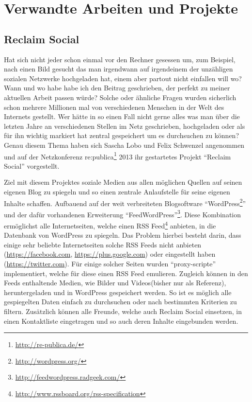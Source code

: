 \section{Verwandte Arbeiten und Projekte} %
\label{sec:verwandte_arbeiten_und_projekte}

\subsection{Reclaim Social} %
\label{sub:verw_arbeiten_reclaim_social}

Hat sich nicht jeder schon einmal vor den Rechner gesessen um, zum Beispiel, nach einen Bild gesucht das man irgendwann auf irgendeinem der unzähligen sozialen Netzwerke hochgeladen hat, einem aber partout nicht einfallen will wo? Wann und wo habe habe ich den Beitrag geschrieben, der perfekt zu meiner aktuellen Arbeit passen würde? Solche oder ähnliche Fragen wurden sicherlich schon mehrere Millionen mal von verschiedenen Menschen in der Welt des Internets gestellt. Wer hätte in so einen Fall nicht gerne alles was man über die letzten Jahre an verschiedenen Stellen im Netz geschrieben, hochgeladen oder als für ihn wichtig markiert hat zentral gespeichert um es durchsuchen zu können? Genau diesem Thema haben sich Sascha Lobo und Felix Schwenzel angenommen und auf der Netzkonferenz re:publica\footnote{\url{http://re-publica.de/}} 2013 ihr gestartetes Projekt \enquote{Reclaim Social} \cite{Schwenzel2013} vorgestellt.

\medskip

Ziel mit diesem Projektes soziale Medien aus allen möglichen Quellen auf seinen eigenen Blog zu spiegeln und so einen zentrale Anlaufstelle für seine eigenen Inhalte schaffen. Aufbauend auf der weit verbreiteten Blogsoftware \enquote{WordPress\footnote{\url{http://wordpress.org/}}} und der dafür vorhandenen Erweiterung \enquote{FeedWordPress}\footnote{\url{http://feedwordpress.radgeek.com/}}. Diese Kombination ermöglichst alle Internetseiten, welche einen RSS Feed\footnote{\url{http://www.rssboard.org/rss-specification}} anbieten, in die Datenbank von WordPress zu spiegeln. Das Problem hierbei besteht darin, dass einige sehr beliebte Internetseiten solche RSS Feeds nicht anbieten (\url{https://facebook.com}, \url{https://plus.google.com}) oder eingestellt haben (\url{https://twitter.com}). Für einige solcher Seiten wurden \enquote{proxy-scripte}\cite[Tecg Specs Details]{Schwenzel2013} implementiert, welche für diese einen RSS Feed emulieren. Zugleich können in den Feeds enthaltende Medien, wie Bilder und Videos(bisher nur als Referenz), heruntergeladen und in WordPress gespeichert werden. So ist es möglich alle gespiegelten Daten einfach zu durchsuchen oder nach bestimmten Kriterien zu filtern. Zusätzlich können alle Freunde, welche auch Reclaim Social einsetzen, in einen Kontaktliste eingetragen und so auch deren Inhalte eingebunden werden.

